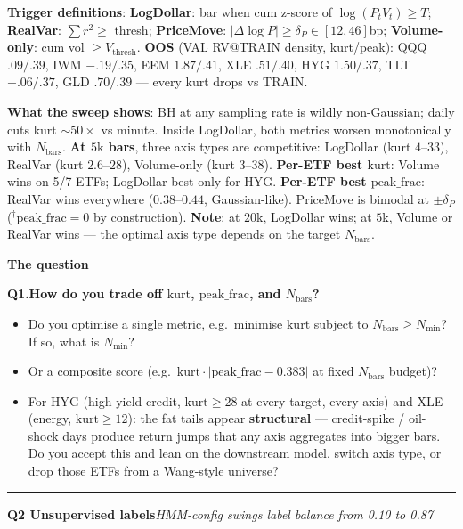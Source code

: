 \documentclass[11pt]{article}
\newcommand{\qhead}[2]{%
  \par\vspace{4pt}\noindent\rule{\linewidth}{0.5pt}\par\vspace{1pt}%
  \noindent\textbf{\large #1}\quad\textit{#2}\par\vspace{4pt}}
\newcommand{\shead}[1]{\par\vspace{4pt}\noindent\textbf{\normalsize #1}\par\vspace{1pt}}
\begin{document}
\smallskip
\textbf{Trigger definitions}: \textbf{LogDollar}: bar when cum z-score of $\log(P_t V_t)\ge T$; \textbf{RealVar}: $\sum r^2 \ge$ thresh; \textbf{PriceMove}: $|\Delta\log P|\ge\delta_P\in[12,46]$bp; \textbf{Volume-only}: cum vol $\ge V_{\mathrm{thresh}}$. \textbf{OOS} (VAL RV@TRAIN density, kurt/peak): QQQ $.09/.39$, IWM $-.19/.35$, EEM $1.87/.41$, XLE $.51/.40$, HYG $1.50/.37$, TLT $-.06/.37$, GLD $.70/.39$ --- every kurt drops vs TRAIN.

\smallskip
\textbf{What the sweep shows}: BH at any sampling rate is wildly non-Gaussian; daily cuts $\mathrm{kurt}$ ${\sim}50{\times}$ vs minute. Inside LogDollar, both metrics worsen monotonically with $N_{\mathrm{bars}}$. \textbf{At $5\mathrm{k}$ bars}, three axis types are competitive: LogDollar (kurt $4$--$33$), RealVar (kurt $2.6$--$28$), Volume-only (kurt $3$--$38$). \textbf{Per-ETF best $\mathrm{kurt}$}: Volume wins on 5/7 ETFs; LogDollar best only for HYG. \textbf{Per-ETF best $\mathrm{peak\_frac}$}: RealVar wins everywhere ($0.38$--$0.44$, Gaussian-like). PriceMove is bimodal at $\pm\delta_P$ ($^{\dagger}\mathrm{peak\_frac}{=}0$ by construction). \textbf{Note}: at $20$k, LogDollar wins; at $5$k, Volume or RealVar wins --- the optimal axis type depends on the target $N_{\mathrm{bars}}$.

\shead{The question}

\textbf{Q1.\enspace How do you trade off $\mathrm{kurt}$, $\mathrm{peak\_frac}$, and $N_{\mathrm{bars}}$?}
\begin{itemize}
\item Do you optimise a single metric, e.g.\ minimise $\mathrm{kurt}$ subject to $N_{\mathrm{bars}} \ge N_{\min}$? If so, what is $N_{\min}$?
\item Or a composite score (e.g.\ $\mathrm{kurt} \cdot |\mathrm{peak\_frac} - 0.383|$ at fixed $N_{\mathrm{bars}}$ budget)?
\item For HYG (high-yield credit, $\mathrm{kurt}\ge 28$ at every target, every axis) and XLE (energy, $\mathrm{kurt}\ge 12$): the fat tails appear \textbf{structural} --- credit-spike / oil-shock days produce return jumps that any axis aggregates into bigger bars. Do you accept this and lean on the downstream model, switch axis type, or drop those ETFs from a Wang-style universe?
\end{itemize}

\newpage

\qhead{Q2 \enspace Unsupervised labels}{HMM-config swings label balance from 0.10 to 0.87}
\end{document}
